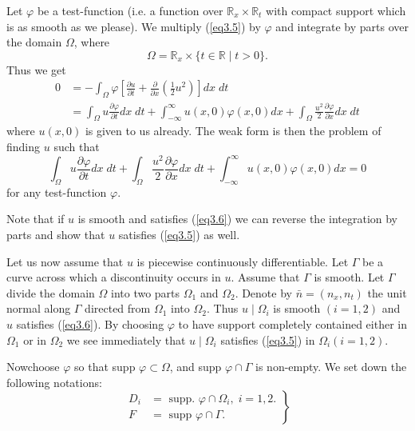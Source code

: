 Let $\varphi$ be a test-function (i.e. a function over $\mathbb{R}_x
\times \mathbb{R}_t$ with compact support which is as smooth as we
please). We multiply (\ref{eq3.5}) by $\varphi$ and integrate by parts over
the domain $\Omega$, where 
$$
\Omega = \mathbb{R}_x \times \{t \in \mathbb{R} \mid t > 0\}.
$$
Thus we get
\begin{align*}
0 & = -\int_{\Omega} \varphi \left[\frac{\partial u}{\partial t} +
  \frac{\partial}{\partial x} \left(\frac{1}{2} u^2\right) \right] dx \; dt\\
& = \int_\Omega u\frac{\partial \varphi}{\partial t} dx\; dt +
\int^\infty_{-\infty} u (x,0) \varphi(x,0) dx + \int_\Omega
\frac{u^2}{2} \frac{\partial \varphi}{\partial x} dx \; dt
\end{align*}
where $u(x,0)$ is given to us already. The weak form is then the
problem of finding $u$ such that 
\begin{equation*}
\int_\Omega u\frac{\partial \varphi}{\partial t } dx \; dt +
\int_\Omega \frac{u^2}{2} \frac{\partial \varphi}{\partial x} dx \; dt
+ \int^\infty_{-\infty} u(x,0) \varphi(x,0) dx = 0
\tag{3.6}\label{eq3.6}  
\end{equation*}
for any test-function $\varphi$.

Note that if $u$ is smooth and satisfies (\ref{eq3.6}) we can reverse the
integration by parts and show that $u$ satisfies (\ref{eq3.5}) as well.

Let us now assume that $u$ is piecewise continuously
differentiable. Let $\Gamma$ be a curve across which a discontinuity
occurs in $u$. Assume that $\Gamma$ is smooth. Let $\Gamma$ divide the
domain $\Omega$ into two parts $\Omega_1$ and $\Omega_2$. Denote by
$\bar{n} = (n_x, n_t)$ the unit normal along $\Gamma$ directed from
$\Omega_1$ into $\Omega_2$. Thus $u\mid \Omega_i$ is smooth $(i=1,2)$
and $u$ satisfies (\ref{eq3.6}). By choosing $\varphi$ to have support
completely contained either in $\Omega_1$ or in $\Omega_2$ we see
immediately that $u\mid \Omega_i$ satisfies (\ref{eq3.5}) in $\Omega_i
(i=1,2)$. 

Now\pageoriginale choose $\varphi$ so that supp $\varphi \subset
\Omega$, and supp $\varphi \cap \Gamma$ is non-empty. We set down the
following notations:
\begin{equation*}
\left. 
\begin{aligned}
D_i & = \text{ supp. } \varphi \cap \Omega_i, \; i = 1,2.\\
F & = \text{ supp } \varphi \cap \Gamma.
\end{aligned}
\right\}
\tag{3.7}\label{eq3.7}
\end{equation*}

